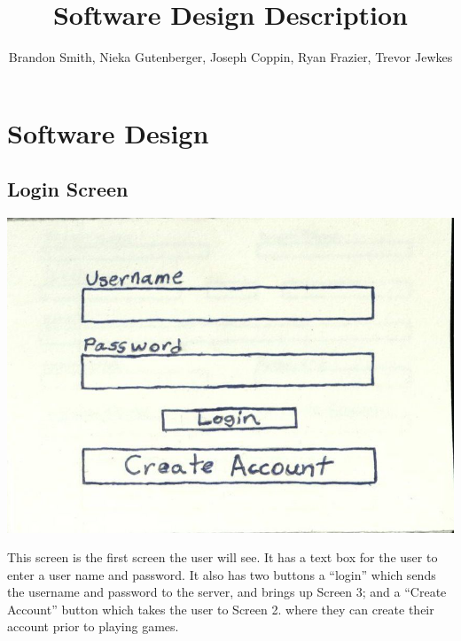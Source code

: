 \documentclass[]{scrartcl}
\title{Software Design Description}
\author{Brandon Smith, Nieka Gutenberger, Joseph Coppin, Ryan Frazier, Trevor Jewkes}
\begin{document}
\maketitle
\pagebreak
\section{Software Design}
\subsection{Login Screen}

\centerline{\includegraphics{1.jpg}}

This screen is the first screen the user will see.  It has a text box for the user to enter a user name and password.  It also has two buttons a “login” which sends the username and password to the server, and brings up Screen 3; and a “Create Account” button which takes the user to Screen 2. where they can create their account prior to playing games. 
\end{document}
